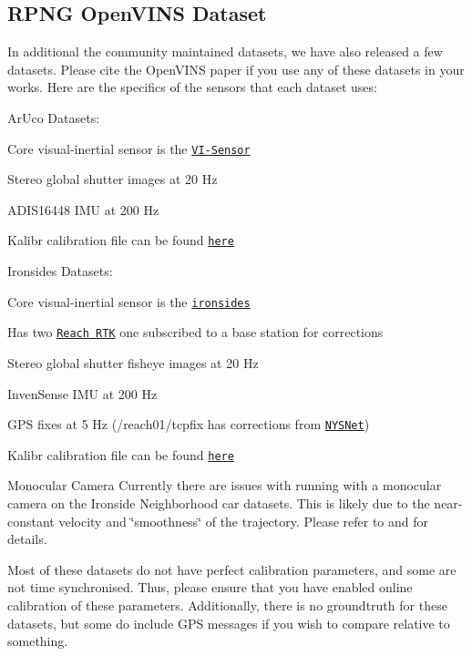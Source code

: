 \hypertarget{gs-datasets_gs-data-rpng}{}\subsection{R\+P\+N\+G Open\+V\+I\+N\+S Dataset}\label{gs-datasets_gs-data-rpng}
In additional the community maintained datasets, we have also released a few datasets. Please cite the Open\+V\+I\+NS paper if you use any of these datasets in your works. Here are the specifics of the sensors that each dataset uses\+:


\begin{DoxyItemize}
\item Ar\+Uco Datasets\+:
\begin{DoxyItemize}
\item Core visual-\/inertial sensor is the \href{https://furgalep.github.io/bib/nikolic_icra14.pdf}{\tt V\+I-\/\+Sensor}
\item Stereo global shutter images at 20 Hz
\item A\+D\+I\+S16448 I\+MU at 200 Hz
\item Kalibr calibration file can be found \href{https://drive.google.com/file/d/1I0C-z3ZrTKne4bdbgBI6CtH1Rk4EQim0/view?usp=sharing}{\tt here}
\end{DoxyItemize}
\item Ironsides Datasets\+:
\begin{DoxyItemize}
\item Core visual-\/inertial sensor is the \href{https://arxiv.org/pdf/1710.00893v1.pdf}{\tt ironsides}
\item Has two \href{https://docs.emlid.com/reach/}{\tt Reach R\+TK} one subscribed to a base station for corrections
\item Stereo global shutter fisheye images at 20 Hz
\item Inven\+Sense I\+MU at 200 Hz
\item G\+PS fixes at 5 Hz (/reach01/tcpfix has corrections from \href{https://cors.dot.ny.gov/sbc}{\tt N\+Y\+S\+Net})
\item Kalibr calibration file can be found \href{https://drive.google.com/file/d/1bhn0GrIYNEeAabQAbWoP8l_514cJ0KrZ/view?usp=sharing}{\tt here}
\end{DoxyItemize}
\end{DoxyItemize}



\begin{DoxyParagraph}{Monocular Camera}
Currently there are issues with running with a monocular camera on the Ironside Neighborhood car datasets. This is likely due to the near-\/constant velocity and \char`\"{}smoothness\char`\"{} of the trajectory. Please refer to \cite{Lee2020IROS} and \cite{Wu2017ICRA} for details.
\end{DoxyParagraph}
Most of these datasets do not have perfect calibration parameters, and some are not time synchronised. Thus, please ensure that you have enabled online calibration of these parameters. Additionally, there is no groundtruth for these datasets, but some do include G\+PS messages if you wish to compare relative to something.

